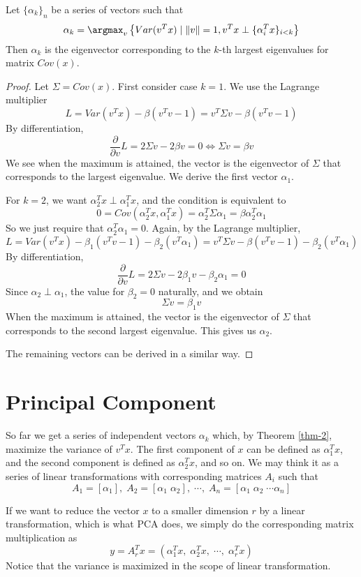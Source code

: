 \begin{theorem}
\label{thm-2}
Let $\{\alpha_k\}_n$ be a series of vectors such that
\[
	\alpha_k = \argmax_v \left\{ Var(v^Tx) \mid \|v\|=1, v^Tx \perp \{\alpha_i^Tx\}_{i<k} \right\}
\]
Then $\alpha_k$ is the eigenvector corresponding to the $k$-th largest eigenvalues for matrix $Cov(x)$.

\end{theorem}

\begin{proof}
	Let $\Sigma=Cov(x)$. First consider case $k=1$. We use the Lagrange multiplier
\[
	L=Var(v^Tx)-\beta(v^Tv - 1)=v^T\Sigma v - \beta(v^Tv - 1)
\]
By differentiation,
\[
	\frac{\partial}{\partial v}L = 2 \Sigma v - 2 \beta v = 0 \Longleftrightarrow \Sigma v = \beta v
\]
We see when the maximum is attained, the vector is the eigenvector of $\Sigma$ that corresponds to the largest eigenvalue. We derive the first vector $\alpha_1$.

For $k=2$, we want $\alpha_2^Tx \perp \alpha_1^Tx$, and the condition is equivalent to
\[
	0 = Cov(\alpha_2^Tx, \alpha_1^Tx) = \alpha_2^T \Sigma \alpha_1 = \beta \alpha_2^T \alpha_1
\]
So we just require that $\alpha_2^T \alpha_1 = 0$. Again, by the Lagrange multiplier,
\[
	L=Var(v^Tx)-\beta_1(v^Tv - 1) - \beta_2(v^T\alpha_1) = v^T\Sigma v - \beta(v^Tv - 1) - \beta_2(v^T\alpha_1)
\]
By differentiation,
\[
	\frac{\partial}{\partial v}L = 2 \Sigma v - 2 \beta_1 v - \beta_2 \alpha_1 = 0
\]
Since $\alpha_2 \perp \alpha_1$, the value for $\beta_2 = 0$ naturally, and we obtain
\[
\Sigma v = \beta_1 v
\]
When the maximum is attained, the vector is the eigenvector of $\Sigma$ that corresponds to the second largest eigenvalue. This gives us $\alpha_2$.

The remaining vectors can be derived in a similar way.

\end{proof}


\section{Principal Component}
So far we get a series of independent vectors $\alpha_k$ which, by Theorem \ref{thm-2}, maximize the variance of $v^Tx$. The first component of $x$ can be defined as $\alpha_1^Tx$, and the second component is defined as $\alpha_2^Tx$, and so on. We may think it as a series of linear transformations with corresponding matrices $A_i$ such that 
\[
	A_1 = [\alpha_1], \; A_2 = [\alpha_1 \; \alpha_2], \; \cdots, \; A_n = [\alpha_1 \; \alpha_2 \; \cdots \alpha_n]
\]

If we want to reduce the vector $x$ to a smaller dimension $r$ by a linear transformation, which is what PCA does, we simply do the corresponding matrix multiplication as
\[
	y = A_r^T x  = (\alpha_1^T x,\; \alpha_2^T x,\; \cdots,\; \alpha_r^T x)
\]
Notice that the variance is maximized in the scope of linear transformation.


\pagebreak

\nocite{*}
\printbibliography


